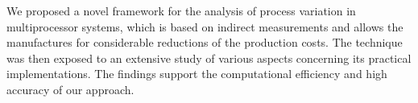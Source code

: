 We proposed a novel framework for the analysis of process variation in multiprocessor systems, which is based on indirect measurements and allows the manufactures for considerable reductions of the production costs. The technique was then exposed to an extensive study of various aspects concerning its practical implementations. The findings support the computational efficiency and high accuracy of our approach.
